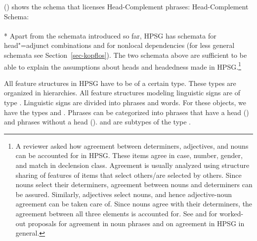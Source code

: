 \documentclass[output=paper
  ,nobabel
  ,draftmode
  ,uniformtopskip %
  ,colorlinks, citecolor=brown
]{langscibook}
\begin{document}
\largerpage[2]
() shows the schema that licenses Head-Complement phrases:
\ea
\label{head-complement-phrase}
Head-Complement Schema:\\
 \impl\\*
\z
Apart from the schemata introduced so far, HPSG has schemata for head"=adjunct combinations and for
nonlocal dependencies (for less general schemata see Section~\ref{sec-kopflos}). The two schemata
above are sufficient to be able to explain the assumptions about heads and headedness made in
HPSG.\footnote{%
  A reviewer asked how agreement between determiners, adjectives, and nouns can be accounted for in
  HPSG. These items agree in case, number, gender, and match in declension class. Agreement is usually
  analyzed using structure sharing of features of items that select others/are selected by
  others. Since nouns select their determiners, agreement between nouns and determiners can be
  assured. Similarly, adjectives select nouns, and hence adjective-noun agreement can be taken
  care of. Since nouns agree with their determiners, the agreement between all three elements is
  accounted for. See  and  for
  worked-out proposals for agreement in  noun phrases and  on agreement in HPSG in general.
}

All feature structures in HPSG have to be of a certain type. These types are organized in hierarchies.
All feature structures modeling linguistic signs are of type . Linguistic signs are
divided into phrases and words. For these objects, we have the types  and
. Phrases can be categorized into phrases that have a head () and
phrases without a head ().  and
 are subtypes of the type .
\end{document}
